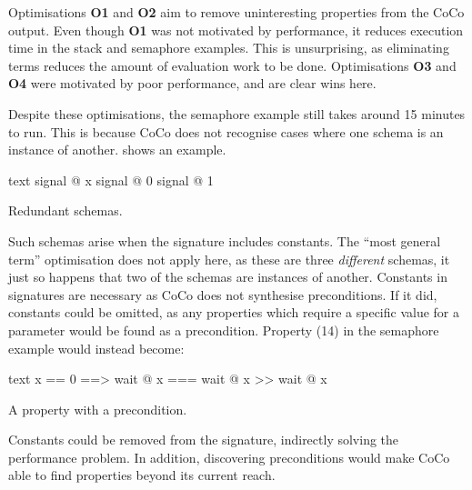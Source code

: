 Optimisations \textbf{O1} and \textbf{O2} aim to remove uninteresting
properties from the CoCo output.  Even though \textbf{O1} was not
motivated by performance, it reduces execution time in the stack and
semaphore examples.  This is unsurprising, as eliminating terms
reduces the amount of evaluation work to be done.  Optimisations
\textbf{O3} and \textbf{O4} were motivated by poor performance, and
are clear wins here.

Despite these optimisations, the semaphore example still takes around
15 minutes to run.  This is because CoCo does not recognise cases
where one schema is an instance of another.  
shows an example.

\begin{listing}
\centering
\begin{cminted}{text}
signal @ x
signal @ 0
signal @ 1
\end{cminted}
\caption{Redundant schemas.}\label{lst:redundant}
\end{listing}

Such schemas arise when the signature includes constants.  The ``most
general term'' optimisation does not apply here, as these are three
\emph{different} schemas, it just so happens that two of the schemas
are instances of another.  Constants in signatures are necessary as
CoCo does not synthesise preconditions.  If it did, constants could be
omitted, as any properties which require a specific value for a
parameter would be found as a precondition.  Property (14) in the
semaphore example would instead become:

\begin{listing}
\centering
\begin{cminted}{text}
x == 0  ==>  wait @ x  ===  wait @ x >> wait @ x
\end{cminted}
\caption{A property with a precondition.}\label{lst:precondition}
\end{listing}

Constants could be removed from the signature, indirectly solving the
performance problem.  In addition, discovering preconditions would
make CoCo able to find properties beyond its current reach.

